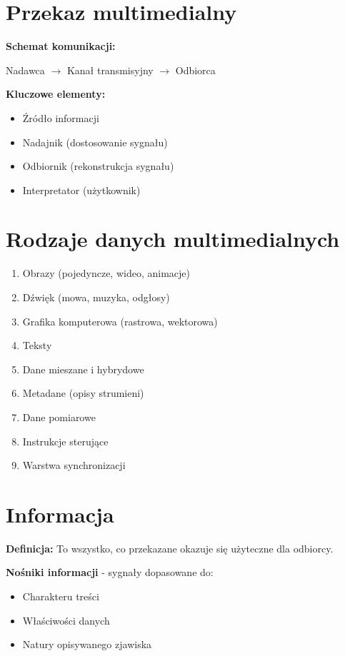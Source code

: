 \section{Przekaz multimedialny}
\textbf{Schemat komunikacji:}
\begin{center}
Nadawca $\rightarrow$ Kanał transmisyjny $\rightarrow$ Odbiorca
\end{center}

\textbf{Kluczowe elementy:}
\begin{itemize}[noitemsep]
    \item Źródło informacji
    \item Nadajnik (dostosowanie sygnału)
    \item Odbiornik (rekonstrukcja sygnału)
    \item Interpretator (użytkownik)
\end{itemize}

\section{Rodzaje danych multimedialnych}
\begin{enumerate}[noitemsep]
    \item Obrazy (pojedyncze, wideo, animacje)
    \item Dźwięk (mowa, muzyka, odgłosy)
    \item Grafika komputerowa (rastrowa, wektorowa)
    \item Teksty
    \item Dane mieszane i hybrydowe
    \item Metadane (opisy strumieni)
    \item Dane pomiarowe
    \item Instrukcje sterujące
    \item Warstwa synchronizacji
\end{enumerate}

\section{Informacja}
\textbf{Definicja:} To wszystko, co przekazane okazuje się użyteczne dla odbiorcy.

\textbf{Nośniki informacji} - sygnały dopasowane do:
\begin{itemize}[noitemsep]
    \item Charakteru treści
    \item Właściwości danych
    \item Natury opisywanego zjawiska
\end{itemize}

